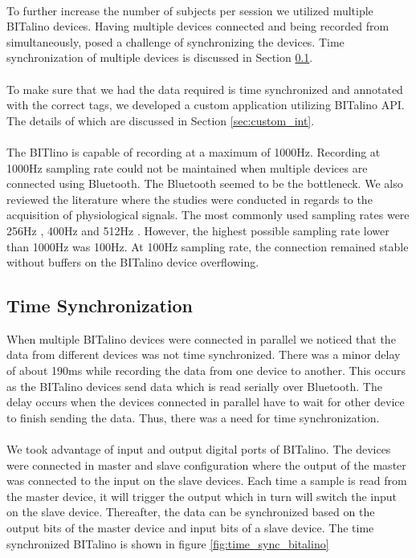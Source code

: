 \paragraph{}
To further increase the number of subjects per session we utilized multiple BITalino devices. Having multiple devices connected and being recorded from simultaneously, posed a challenge of synchronizing the devices. Time synchronization of multiple devices is discussed in Section \ref{sec:time_sync}.
\paragraph{}
To make sure that we had the data required is time synchronized and annotated with the correct tags, we developed a custom application utilizing BITalino API. The details of which are discussed in Section \ref{sec:custom_int}.
\paragraph{}
The BITlino is capable of recording at a maximum of 1000Hz. Recording at 1000Hz sampling rate could not be maintained when multiple devices are connected using Bluetooth. The Bluetooth seemed to be the bottleneck. We also reviewed the literature where the studies were conducted in regards to the acquisition of physiological signals. The most commonly used sampling rates were 256Hz \cite{kim_emotion_2004} \cite{kim_emotion_2008}, 400Hz \cite{w_wen_2014} and 512Hz \cite{koelstra_deap:_2012}. However, the highest possible sampling rate lower than 1000Hz was 100Hz. At 100Hz sampling rate, the connection remained stable without buffers on the BITalino device overflowing.

\subsection{Time Synchronization}
\label{sec:time_sync}
When multiple BITalino devices were connected in parallel we noticed that the data from different devices was not time synchronized. There was a minor delay of about 190ms while recording the data from one device to another. This occurs as the BITalino devices send data which is read serially over Bluetooth. The delay occurs when the devices connected in parallel have to wait for other device to finish sending the data. Thus, there was a need for time synchronization. 
\paragraph{}
We took advantage of input and output digital ports of BITalino. The devices were connected in master and slave configuration where the output of the master was connected to the input on the slave devices. Each time a sample is read from the master device, it will trigger the output which in turn will switch the input on the slave device. Thereafter, the data can be synchronized based on the output bits of the master device and input bits of a slave device. The time synchronized BITalino is shown in figure \ref{fig:time_sync_bitalino}

